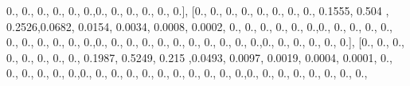 \documentclass[
]{book}
\newenvironment{Shaded}{\begin{snugshade}}{\end{snugshade}}
\newcommand{\FloatTok}[1]{\textcolor[rgb]{0.00,0.00,0.81}{#1}}
\newcommand{\NormalTok}[1]{#1}
\begin{document}
\begin{Shaded}
\begin{Highlighting}[]
\FloatTok{0.}\NormalTok{, }\FloatTok{0.}\NormalTok{, }\FloatTok{0.}\NormalTok{, }\FloatTok{0.}\NormalTok{, }\FloatTok{0.}\NormalTok{, }\FloatTok{0.}\NormalTok{,}\FloatTok{0.}\NormalTok{, }\FloatTok{0.}\NormalTok{, }\FloatTok{0.}\NormalTok{, }\FloatTok{0.}\NormalTok{, }\FloatTok{0.}\NormalTok{, }\FloatTok{0.}\NormalTok{], [}\FloatTok{0.}\NormalTok{, }\FloatTok{0.}\NormalTok{, }\FloatTok{0.}\NormalTok{, }\FloatTok{0.}\NormalTok{, }\FloatTok{0.}\NormalTok{, }\FloatTok{0.}\NormalTok{, }\FloatTok{0.}\NormalTok{, }\FloatTok{0.}\NormalTok{,}
\FloatTok{0.1555}\NormalTok{, }\FloatTok{0.504}\NormalTok{ , }\FloatTok{0.2526}\NormalTok{,}\FloatTok{0.0682}\NormalTok{, }\FloatTok{0.0154}\NormalTok{, }\FloatTok{0.0034}\NormalTok{, }\FloatTok{0.0008}\NormalTok{, }\FloatTok{0.0002}\NormalTok{, }\FloatTok{0.}\NormalTok{, }\FloatTok{0.}\NormalTok{, }\FloatTok{0.}\NormalTok{, }\FloatTok{0.}\NormalTok{,}
\FloatTok{0.}\NormalTok{, }\FloatTok{0.}\NormalTok{,}\FloatTok{0.}\NormalTok{, }\FloatTok{0.}\NormalTok{, }\FloatTok{0.}\NormalTok{, }\FloatTok{0.}\NormalTok{, }\FloatTok{0.}\NormalTok{, }\FloatTok{0.}\NormalTok{, }\FloatTok{0.}\NormalTok{, }\FloatTok{0.}\NormalTok{, }\FloatTok{0.}\NormalTok{, }\FloatTok{0.}\NormalTok{, }\FloatTok{0.}\NormalTok{,}\FloatTok{0.}\NormalTok{, }\FloatTok{0.}\NormalTok{, }\FloatTok{0.}\NormalTok{, }\FloatTok{0.}\NormalTok{, }\FloatTok{0.}\NormalTok{, }\FloatTok{0.}\NormalTok{, }\FloatTok{0.}\NormalTok{,}
\FloatTok{0.}\NormalTok{, }\FloatTok{0.}\NormalTok{, }\FloatTok{0.}\NormalTok{, }\FloatTok{0.}\NormalTok{,}\FloatTok{0.}\NormalTok{, }\FloatTok{0.}\NormalTok{, }\FloatTok{0.}\NormalTok{, }\FloatTok{0.}\NormalTok{, }\FloatTok{0.}\NormalTok{, }\FloatTok{0.}\NormalTok{], [}\FloatTok{0.}\NormalTok{, }\FloatTok{0.}\NormalTok{, }\FloatTok{0.}\NormalTok{, }\FloatTok{0.}\NormalTok{, }\FloatTok{0.}\NormalTok{, }\FloatTok{0.}\NormalTok{, }\FloatTok{0.}\NormalTok{, }\FloatTok{0.}\NormalTok{, }\FloatTok{0.1987}\NormalTok{,}
\FloatTok{0.5249}\NormalTok{, }\FloatTok{0.215}\NormalTok{ ,}\FloatTok{0.0493}\NormalTok{, }\FloatTok{0.0097}\NormalTok{, }\FloatTok{0.0019}\NormalTok{, }\FloatTok{0.0004}\NormalTok{, }\FloatTok{0.0001}\NormalTok{, }\FloatTok{0.}\NormalTok{, }\FloatTok{0.}\NormalTok{, }\FloatTok{0.}\NormalTok{, }\FloatTok{0.}\NormalTok{, }\FloatTok{0.}\NormalTok{,}
\FloatTok{0.}\NormalTok{,}\FloatTok{0.}\NormalTok{, }\FloatTok{0.}\NormalTok{, }\FloatTok{0.}\NormalTok{, }\FloatTok{0.}\NormalTok{, }\FloatTok{0.}\NormalTok{, }\FloatTok{0.}\NormalTok{, }\FloatTok{0.}\NormalTok{, }\FloatTok{0.}\NormalTok{, }\FloatTok{0.}\NormalTok{, }\FloatTok{0.}\NormalTok{, }\FloatTok{0.}\NormalTok{,}\FloatTok{0.}\NormalTok{, }\FloatTok{0.}\NormalTok{, }\FloatTok{0.}\NormalTok{, }\FloatTok{0.}\NormalTok{, }\FloatTok{0.}\NormalTok{, }\FloatTok{0.}\NormalTok{, }\FloatTok{0.}\NormalTok{, }\FloatTok{0.}\NormalTok{,}

\end{Highlighting}
\end{Shaded}
\end{document}
